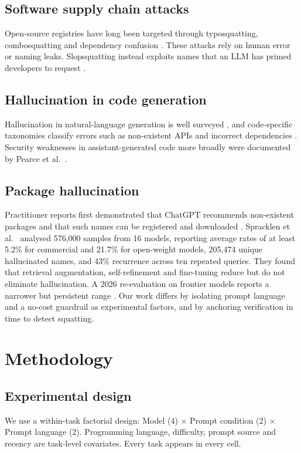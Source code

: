 \documentclass[conference]{IEEEtran}
\begin{document}
\subsection{Software supply chain attacks}
Open-source registries have long been targeted through typosquatting, combosquatting and dependency confusion \cite{ohm2020,vu2020,ladisa2023}. These attacks rely on human error or naming leaks. Slopsquatting instead exploits names that an LLM has primed developers to request \cite{socket2025}.

\subsection{Hallucination in code generation}
Hallucination in natural-language generation is well surveyed \cite{ji2023}, and code-specific taxonomies classify errors such as non-existent APIs and incorrect dependencies \cite{liu2024}. Security weaknesses in assistant-generated code more broadly were documented by Pearce et al.~\cite{pearce2022}.

\subsection{Package hallucination}
Practitioner reports first demonstrated that ChatGPT recommends non-existent packages and that such names can be registered and downloaded \cite{lanyado2023,lanyado2024}. Spracklen et al.~\cite{spracklen2025} analysed 576,000 samples from 16 models, reporting average rates of at least 5.2\% for commercial and 21.7\% for open-weight models, 205,474 unique hallucinated names, and 43\% recurrence across ten repeated queries. They found that retrieval augmentation, self-refinement and fine-tuning reduce but do not eliminate hallucination. A 2026 re-evaluation on frontier models reports a narrower but persistent range \cite{churilov2026}. Our work differs by isolating prompt language and a no-cost guardrail as experimental factors, and by anchoring verification in time to detect squatting.

\section{Methodology}
\subsection{Experimental design}
We use a within-task factorial design: Model (4) $\times$ Prompt condition (2) $\times$ Prompt language (2). Programming language, difficulty, prompt source and recency are task-level covariates. Every task appears in every cell.
\end{document}
